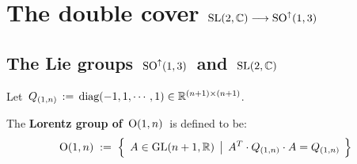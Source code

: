 

\chapter{The double cover $\textnormal{SL}(2,\mathbb{C}) \longrightarrow \textnormal{SO}^{\uparrow}(1,3)$}
\setcounter{theorem}{0}
\setcounter{equation}{0}


\renewcommand{\theenumi}{\roman{enumi}}
\renewcommand{\labelenumi}{\textnormal{(\theenumi)}$\;\;$}


\section{The Lie groups \,$\textnormal{SO}^{\uparrow}(1,3)$\, and \,$\textnormal{SL}(2,\mathbb{C})$}



Let \,$Q_{(1,n)} \,:=\, \textnormal{diag}(-1,1,\cdots,1) \in \mathbb{R}^{(n+1) \times (n+1)}$.

\vskip 0.5cm
\begin{definition}[$\textnormal{O}(1,n)$]
\mbox{}
\vskip 0.1cm
\noindent
The \textbf{Lorentz group of \,$\textnormal{O}(1,n)$}\, is defined to be:
\begin{equation*}
\textnormal{O}(1,n)
\; := \;
	\left\{\;\,
		A \overset{{\color{white}.}}{\in} \textnormal{GL}(n+1,\Re)
		\;\left\vert\;\,
			A^{T} \cdot Q_{(1,n)} \cdot A = Q_{(1,n)}
			\right.
		\;\right\}
\end{equation*}
\end{definition}

